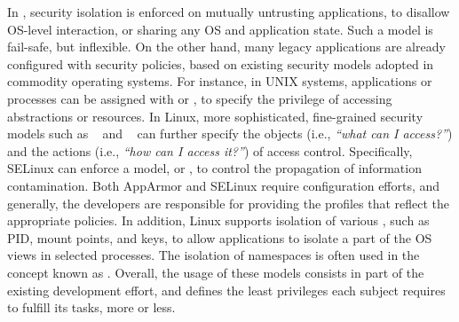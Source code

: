 

\label{sec:future:security}


In \liboses{}, security isolation is enforced on mutually untrusting applications,
to disallow OS-level interaction,
or sharing any OS and application state.
Such a model is fail-safe, but inflexible.
On the other hand, many legacy applications are already
configured with security policies,
based on existing security models adopted in commodity operating systems.
For instance, in UNIX systems, applications or processes
can be assigned with  or ,
to specify the privilege of accessing abstractions or resources.
In Linux, more sophisticated, fine-grained security models
such as ~\citep{apparmor} and ~\citep{selinux}
can further specify the objects (i.e., \emph{``what can I access?''})
and the actions (i.e., \emph{``how can I access it?''}) of access control.
Specifically, SELinux can enforce a  model, or ,
to control the propagation of information contamination.
Both AppArmor and SELinux require configuration efforts,
and generally, the developers are responsible for
providing the profiles
that reflect the appropriate policies.
In addition,
Linux supports isolation of various ,
such as PID, mount points, and \sysvipc{} keys, 
to allow applications to isolate a part of the OS views in selected processes.
The isolation of namespaces is often used in the concept known as .
Overall, the usage of these models consists in
part of the existing development effort,
and defines the least privileges each subject requires
to fulfill its tasks, more or less.


